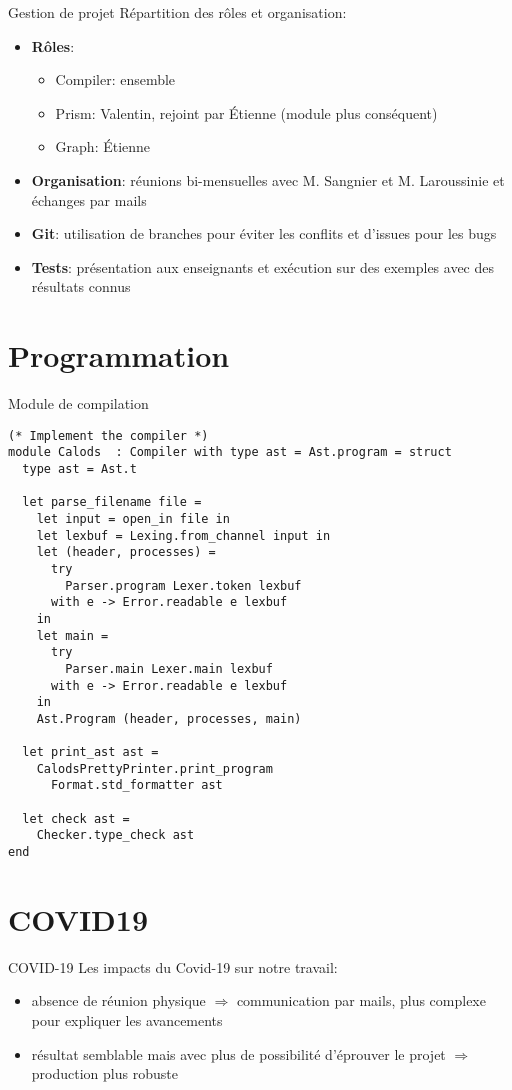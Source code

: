 \documentclass[11pt]{beamer}
\begin{document}
\begin{frame}{Gestion de projet}
Répartition des rôles et organisation:
\begin{itemize}
  \item \textbf{Rôles}:
  \begin{itemize}
    \item Compiler: ensemble
    \item Prism: Valentin, rejoint par Étienne (module plus conséquent)
    \item Graph: Étienne
  \end{itemize}
  \item \textbf{Organisation}: réunions bi-mensuelles avec M. Sangnier et M. Laroussinie et échanges par mails
  \item \textbf{Git}: utilisation de branches pour éviter les conflits et d'issues pour les bugs
  \item \textbf{Tests}: présentation aux enseignants et exécution sur des exemples avec des résultats connus
\end{itemize}
\end{frame}

\section{Programmation}
\begin{frame}[fragile]{Module de compilation}
\begin{verbatim}
(* Implement the compiler *)
module Calods  : Compiler with type ast = Ast.program = struct
  type ast = Ast.t

  let parse_filename file =
    let input = open_in file in
    let lexbuf = Lexing.from_channel input in
    let (header, processes) =
      try
        Parser.program Lexer.token lexbuf
      with e -> Error.readable e lexbuf
    in
    let main =
      try
        Parser.main Lexer.main lexbuf
      with e -> Error.readable e lexbuf
    in
    Ast.Program (header, processes, main)

  let print_ast ast =
    CalodsPrettyPrinter.print_program
      Format.std_formatter ast

  let check ast =
    Checker.type_check ast
end

\end{verbatim}
\end{frame}


\section{COVID19}
\begin{frame}{COVID-19}
  Les impacts du Covid-19 sur notre travail:
  \begin{itemize}
    \item absence de réunion physique $\Rightarrow$ communication par mails, plus complexe pour expliquer les avancements
    \item résultat semblable mais avec plus de possibilité d'éprouver le projet $\Rightarrow$ production plus robuste
  \end{itemize}
\end{frame}
\end{document}
